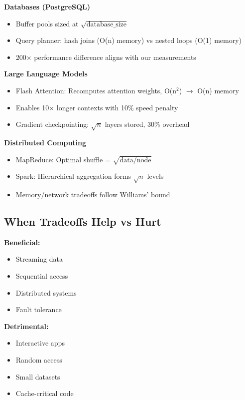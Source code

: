 \documentclass[11pt,twocolumn]{article}
\begin{document}
\textbf{Databases (PostgreSQL)}
\begin{itemize}
\item Buffer pools sized at $\sqrt{\text{database\_size}}$
\item Query planner: hash joins (O(n) memory) vs nested loops (O(1) memory)  
\item 200$\times$ performance difference aligns with our measurements
\end{itemize}

\textbf{Large Language Models}
\begin{itemize}
\item Flash Attention: Recomputes attention weights, O(n$^2$) $\rightarrow$ O(n) memory
\item Enables 10$\times$ longer contexts with 10\% speed penalty
\item Gradient checkpointing: $\sqrt{n}$ layers stored, 30\% overhead
\end{itemize}

\textbf{Distributed Computing}
\begin{itemize}
\item MapReduce: Optimal shuffle = $\sqrt{\text{data/node}}$
\item Spark: Hierarchical aggregation forms $\sqrt{n}$ levels
\item Memory/network tradeoffs follow Williams' bound
\end{itemize}

\subsection{When Tradeoffs Help vs Hurt}

\begin{minipage}[t]{0.48\columnwidth}
\textbf{Beneficial:}
\begin{itemize}
\item Streaming data
\item Sequential access
\item Distributed systems
\item Fault tolerance
\end{itemize}
\end{minipage}
\hfill
\begin{minipage}[t]{0.48\columnwidth}
\textbf{Detrimental:}
\begin{itemize}
\item Interactive apps
\item Random access
\item Small datasets  
\item Cache-critical code
\end{itemize}
\end{minipage}
\end{document}
